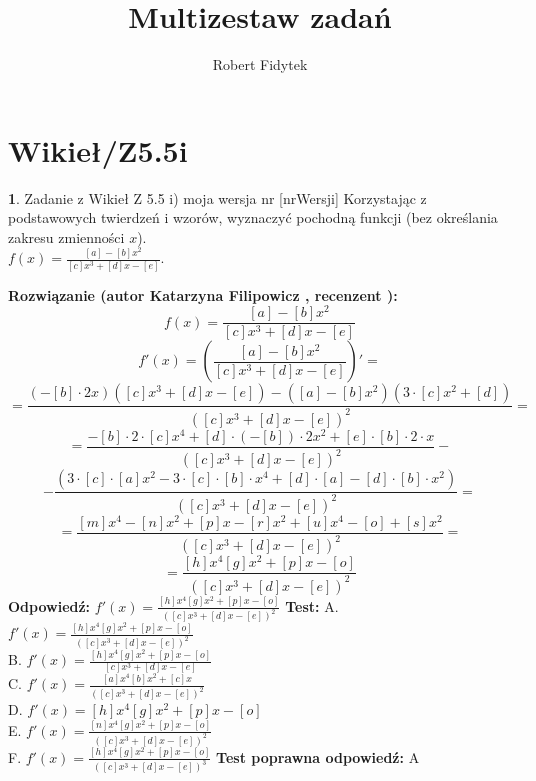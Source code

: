 \documentclass[12pt, a4paper]{article}
\title{Multizestaw zadań}
\author{Robert Fidytek}
\date{}
\theoremstyle{definition} %
\newtheorem{zad}{}
\newcommand{\kategoria}[1]{\section{#1}} %
\newcommand{\zadStart}[1]{\begin{zad}#1\newline} %
\newcommand{\zadStop}{\end{zad}}   %
\newcommand{\rozwStart}[2]{\noindent \textbf{Rozwiązanie (autor #1 , recenzent #2): }\newline} %
\newcommand{\rozwStop}{\newline}                                            %
\newcommand{\odpStart}{\noindent \textbf{Odpowiedź:}\newline}    %
\newcommand{\odpStop}{\newline}                                             %
\newcommand{\testStart}{\noindent \textbf{Test:}\newline} %
\newcommand{\testStop}{\newline} %
\newcommand{\kluczStart}{\noindent \textbf{Test poprawna odpowiedź:}\newline} %
\newcommand{\kluczStop}{\newline} %
\begin{document}
\maketitle


\kategoria{Wikieł/Z5.5i}
\zadStart{Zadanie z Wikieł Z 5.5 i) moja wersja nr [nrWersji]}
Korzystając z podstawowych twierdzeń i wzorów, wyznaczyć pochodną funkcji (bez określania zakresu zmienności $x$).\\ $f(x)=\frac{[a]-[b]x^2}{[c]x^3+[d]x-[e]}$.
\zadStop
\rozwStart{Katarzyna Filipowicz}{}
$$f(x)=\frac{[a]-[b]x^2}{[c]x^3+[d]x-[e]}$$
$$f'(x)=\left(\frac{[a]-[b]x^2}{[c]x^3+[d]x-[e]}\right)' = $$
$$ = \frac{\left(-[b]\cdot 2x\right)([c]x^3+[d]x-[e])- \left([a]-[b]x^2\right) (3\cdot [c]x^2+[d])}{([c]x^3+[d]x-[e])^2} = $$
$$
=\frac{-[b]\cdot 2 \cdot [c]x^4+[d]\cdot(-[b])\cdot 2 x^2+[e]\cdot [b]\cdot 2 \cdot x}{([c]x^3+[d]x-[e])^2}-
$$ $$
-\frac{(3\cdot [c]\cdot [a]x^2-3\cdot [c]\cdot[b]\cdot  x^4+[d]\cdot[a]-[d]\cdot [b] \cdot x^2) }{([c]x^3+[d]x-[e])^2}=
$$ $$
=\frac{[m]x^4-[n]x^2+[p]x-[r]x^2+[u]x^4-[o]+[s]x^2 }{([c]x^3+[d]x-[e])^2}=
$$ $$
=\frac{[h]x^4 [g]x^2+[p]x-[o]}{([c]x^3+[d]x-[e])^2}
$$
\rozwStop
\odpStart
$ f'(x)=\frac{[h]x^4 [g]x^2+[p]x-[o]}{([c]x^3+[d]x-[e])^2}$
\odpStop
\testStart
A. $ f'(x)=\frac{[h]x^4 [g]x^2+[p]x-[o]}{([c]x^3+[d]x-[e])^2}$\\
B. $ f'(x)=\frac{[h]x^4 [g]x^2+[p]x-[o]}{[c]x^3+[d]x-[e]}$\\
C. $ f'(x)=\frac{[a]x^4 [b]x^2+[c]x}{([c]x^3+[d]x-[e])^2}$ \\
D. $ f'(x)=[h]x^4 [g]x^2+[p]x-[o]$\\
E. $ f'(x)=\frac{[n]x^4 [g]x^2+[p]x-[o]}{([c]x^3+[d]x-[e])^2}$\\
F. $ f'(x)=\frac{[h]x^4 [g]x^2+[p]x-[o]}{([c]x^3+[d]x-[e])^3}$
\testStop
\kluczStart
A
\kluczStop
\end{document}
